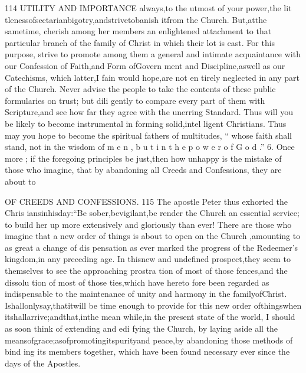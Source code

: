 \documentclass[
]{book}
\begin{document}
114 UTILITY AND IMPORTANCE
always,to the utmost of your power,the lit tlenessofsectarianbigotry,andstrivetobanish itfrom the Church. But,atthe sametime,
cherish among her members an enlightened attachment to that particular branch of the family of Christ in which their lot is cast. For this purpose, strive to promote among
them a general and intimate acquaintance with our Confession of Faith,and Form ofGovern
ment and Discipline,aswell as our Catechisms, which latter,I fain would hope,are not en tirely neglected in any part of the Church. Never advise the people to take the contents of these public formularies on trust; but dili gently to compare every part of them with Scripture,and see how far they agree with the unerring Standard. Thus will you be likely to become instrumental in forming solid,intel ligent Christians. Thus may you hope to become the spiritual fathers of multitudes, `` whose faith shall stand, not in the wisdom of m e n , b u t i n t h e p o w e r o f G o d .''
6. Once more ; if the foregoing principles be just,then how unhappy is the mistake of those who imagine, that by abandoning all Creeds and Confessions, they are about to

OF CREEDS AND CONFESSIONS. 115
The apostle Peter thus exhorted the Chris iansinhisday:``Be sober,bevigilant,be
render the Church an essential service; to build her up more extensively and gloriously than ever! There are those who imagine that a new order of things is about to open on the Church ,amounting to as great a change of dis
pensation as ever marked the progress of the Redeemer's kingdom,in any preceding age. In thisnew and undefined prospect,they seem to themselves to see the approaching prostra tion of most of those fences,and the dissolu tion of most of those ties,which have hereto fore been regarded as indispensable to the maintenance of unity and harmony in the familyofChrist. Ishallonlysay,thatitwill be time enough to provide for this new order ofthingswhen itshallarrive;andthat,inthe mean while,in the present state of the world, I should as soon think of extending and edi
fying the Church, by laying aside all the meansofgrace;asofpromotingitspurityand peace,by abandoning those methods of bind ing its members together, which have been
found necessary ever since the days of the Apostles.
\end{document}
